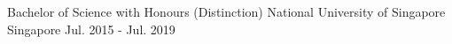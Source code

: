 

\begin{cventries}

  \cventry
    {Bachelor of Science with Honours (Distinction)} %
    {National University of Singapore} %
    {Singapore} %
    {Jul. 2015 - Jul. 2019} %
    {}
\end{cventries}
